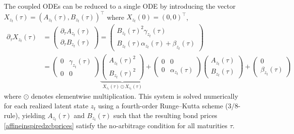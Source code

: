 The coupled ODEs can be reduced to a single ODE by introducing the vector $X_{z_t}(\tau)=(A_{z_t}(\tau),B_{z_t}(\tau))^\top$ where $X_{z_t}(0)=(0,0)^\top$,
\begin{align*}
    \partial_{\tau}X_{z_t}(\tau)&=
    \begin{pmatrix}
     \partial_{\tau}A_{z_t}(\tau)\\
     \partial_{\tau}B_{z_t}(\tau)   
    \end{pmatrix}=\begin{pmatrix}
     B_{z_t}(\tau)^2\gamma_{z_t}(\tau)\\
     B_{z_t}(\tau)\alpha_{z_t}(\tau)+\beta_{z_t}(\tau)  
    \end{pmatrix}\\
    &=\begin{pmatrix}
        0 & \gamma_{z_t}(\tau)\\
        0 & 0
    \end{pmatrix}
    \underbrace{\begin{pmatrix}
     A_{z_t}(\tau)^2\\
     B_{z_t}(\tau)^2   
    \end{pmatrix}}_{X_{z_t}(\tau)\odot X_{z_t}(\tau) }+
    \begin{pmatrix}
        0 & 0\\
        0 & \alpha_{z_t}(\tau)
    \end{pmatrix}
    \begin{pmatrix}
     A_{z_t}(\tau)\\
     B_{z_t}(\tau)   
    \end{pmatrix}+
    \begin{pmatrix}
     0\\
     \beta_{z_t}(\tau)   
    \end{pmatrix}
\end{align*}
where $\odot$ denotes elementwise multiplication. This system is solved numerically for each realized latent state $z_t$ using a fourth-order Runge--Kutta scheme (3/8-rule), yielding $A_{z_t}(\tau)$ and $B_{z_t}(\tau)$ such that the resulting bond prices \eqref{affineinspiredzcbprices} satisfy the no-arbitrage condition for all maturities $\tau$.




